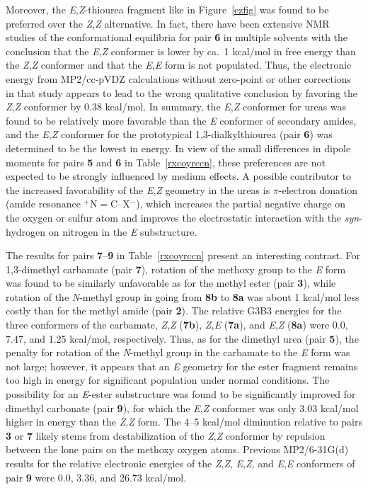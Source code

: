 \documentclass[12pt]{report}
\def\tablab{Table}\def\tabslab{\tablab s}
\def\figlab{Figure}\def\figslab{\figlab s}
\newcommand*\tbl[1]{\tablab~\ref{#1}}
\newcommand*\fig[1]{\figlab~\ref{#1}}
\begin{document}
Moreover, the \textit{E},\textit{Z}-thiourea fragment like in \fig{ezfig} was found to be preferred over the \textit{Z},\textit{Z} alternative. In fact, there have been extensive NMR studies of the conformational equilibria for pair \textbf{6} in multiple solvents with the conclusion that the \textit{E},\textit{Z} conformer is lower by ca.\ 1 kcal/mol in free energy than the \textit{Z},\textit{Z} conformer and that the \textit{E},\textit{E} form is not populated.\cite{chambers} Thus, the electronic energy from MP2/cc-pVDZ calculations without zero-point or other corrections in that study appears to lead to the wrong qualitative conclusion by favoring the \textit{Z},\textit{Z} conformer by 0.38 kcal/mol.\cite{klebe} In summary, the \textit{E},\textit{Z} conformer for ureas was found to be relatively more favorable than the \textit{E} conformer of secondary amides, and the \textit{E},\textit{Z} conformer for the prototypical 1,3-dialkylthiourea (pair \textbf{6}) was determined to be the lowest in energy. In view of the small differences in dipole moments for pairs \textbf{5} and \textbf{6} in \tbl{rxcoyrccn}, these preferences are not expected to be strongly influenced by medium effects. A possible contributor to the increased favorability of the \textit{E},\textit{Z} geometry in the ureas is 
$\pi$-electron donation (amide resonance $^+$N$=$C--X$^-$), which increases the partial negative charge on the oxygen or sulfur atom and improves the electrostatic interaction with the \textit{syn}-hydrogen on nitrogen in the \textit{E} substructure.

The results for pairs \textbf{7}--\textbf{9} in \tbl{rxcoyrccn} present an interesting contrast. For 1,3-dimethyl carbamate (pair \textbf{7}), rotation of the methoxy group to the \textit{E} form was found to be similarly unfavorable as for the methyl ester (pair \textbf{3}), while rotation of the \textit{N}-methyl group in going from \textbf{8b} to \textbf{8a} was about 1 kcal/mol less costly than for the methyl amide (pair \textbf{2}). The relative G3B3 energies for the three conformers of the carbamate, \textit{Z},\textit{Z} (\textbf{7b}), \textit{Z,E} (\textbf{7a}), and \textit{E},\textit{Z} (\textbf{8a}) were 0.0, 7.47, and 1.25 kcal/mol, respectively. Thus, as for the dimethyl urea (pair \textbf{5}), the penalty for rotation of the \textit{N}-methyl group in the carbamate to the \textit{E} form was not large; however, it appears that an \textit{E} geometry for the ester fragment remains too high in energy for significant population under normal conditions. The possibility for an \textit{E}-ester substructure was found to be significantly improved for dimethyl carbonate (pair \textbf{9}), for which the \textit{E},\textit{Z} conformer was only 3.03 kcal/mol higher in energy than the \textit{Z},\textit{Z} form. The 4--5 kcal/mol diminution relative to pairs \textbf{3} or \textbf{7} likely stems from destabilization of the \textit{Z},\textit{Z} conformer by repulsion between the lone pairs on the methoxy oxygen atoms. Previous MP2/6-31G(d) results for the relative electronic energies of the \textit{Z},\textit{Z}, \textit{E},\textit{Z}, and \textit{E},\textit{E} conformers of pair \textbf{9} were 0.0, 3.36, and 26.73 kcal/mol.\cite{sun}
\end{document}
